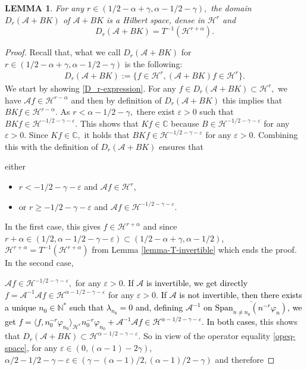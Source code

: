 \documentclass[11pt, dvipsnames]{amsart}
\newtheorem{lem}[theorem]{LEMMA}
\begin{document}
\begin{lem}\label{Lemma-Dr}
    For any $r\in(1/2-\alpha +\gamma,\alpha-1/2-\gamma),$ the domain $D_r(\mathcal{A}+BK)$ of $\mathcal{A}+BK$ is a Hilbert space, dense in $\mathcal{H}^r$ and 
    \begin{equation}
        D_r(\mathcal{A}+BK)=T^{-1}(\mathcal{H}^{r+\alpha}).\label{D_r-expression}
    \end{equation}
\end{lem}
\begin{proof}
Recall that, what we call $D_r(\mathcal{A}+BK)$ for $r\in (1/2-\alpha +\gamma,\alpha-1/2-\gamma)$ is the following:
\begin{align*}
  D_r(\mathcal{A}+BK):=\{f\in \mathcal{H}^r, (\mathcal{A}+BK)f\in \mathcal{H}^r\}.  
\end{align*}
 We start by showing \eqref{D_r-expression}. For any $f\in D_r(\mathcal{A}+BK)\subset{\mathcal{H}^r},$ we have $\mathcal{A}f\in \mathcal{H}^{r-\alpha}$ and then by definition of $D_{r}(\mathcal{A}+BK)$ this implies that $BKf\in\mathcal{H}^{r-\alpha}$. As $r<\alpha-1/2-\gamma,$ there exist $\varepsilon >0$ such that $BKf\in\mathcal{H}^{-1/2-\gamma-\varepsilon}$. 
  This shows that $Kf\in \mathbb{C}$ because $B\in \mathcal{H}^{-1/2-\gamma-\varepsilon}$ for any $\varepsilon>0.$ Since $Kf\in \mathbb{C},$ it holds that $BKf\in\mathcal{H}^{-1/2-\gamma-\varepsilon}$
  for any $\varepsilon>0$. Combining this with the definition of $D_r(\mathcal{A}+BK)$ ensures that {\color{black} either
  \begin{itemize}
      \item $r< -1/2-\gamma-\varepsilon$ and $\mathcal{A}f\in \mathcal{H}^{r}$,
      \item or $r\geq -1/2-\gamma-\varepsilon$ and $\mathcal{A}f\in \mathcal{H}^{-1/2-\gamma-\varepsilon}$.
  \end{itemize}
  In the first case, this gives 
  $f\in \mathcal{H}^{r+\alpha}$ and since $r+\alpha \in (1/2,\alpha-1/2-\gamma-\varepsilon)\subset(1/2-\alpha+\gamma,\alpha-1/2)$, $\mathcal{H}^{r+\alpha}= T^{-1}(\mathcal{H}^{r+\alpha})$ from Lemma \ref{lemma-T-invertible} which ends the proof. In the second case,} 
  $\mathcal{A}f\in \mathcal{H}^{-1/2-\gamma-\varepsilon},$ for any $\varepsilon>0$. \textcolor{black}{If $\mathcal{A}$ is invertible, we get directly}
$f=\mathcal{A}^{-1}\mathcal{A}f\in \mathcal{H}^{\alpha-1/2-\gamma-\varepsilon}$ for any $\varepsilon>0.$ \textcolor{black}{If $\mathcal{A}$ is not invertible, then there exists a unique $n_{0}\in \mathbb{N}^{*}$ such that $\lambda_{n_{0}}=0$ and, defining $\mathcal{A}^{-1}$ on $\overline{\text{Span}_{n\neq n_{0}}(n^{-r}\varphi_{n})}$, we get $f=\langle f,n_{0}^{-r}\varphi_{n_{0}}\rangle_{\mathcal{H}^{r}}n_{0}^{-r}\varphi_{n_{0}}+\mathcal{A}^{-1}\mathcal{A}f\in \mathcal{H}^{\alpha-1/2-\gamma-\varepsilon}$. In both cases, t}his shows that $D_r(\mathcal{A}+BK)\subset\mathcal{H}^{\alpha-1/2-\gamma-\varepsilon}.$ So in view of the operator equality \eqref{opeq-space}, for any $\varepsilon\in (0,(\alpha-1)-2\gamma)$, $\alpha/2-1/2-\gamma-\varepsilon \in (\gamma-(\alpha-1)/2,(\alpha-1)/2-\gamma)$ and therefore

\end{proof}
\end{document}
